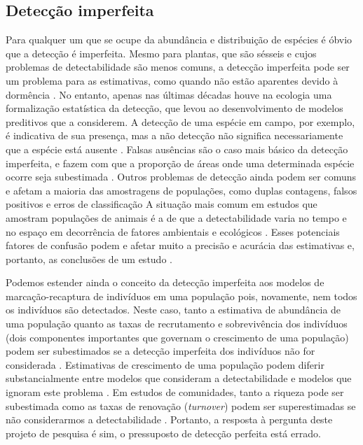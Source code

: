\documentclass[12pt, A4]{article}
\begin{document}
\subsection*{Detecção imperfeita}
\label{sec:deteccao-imperfeita}

Para qualquer um que se ocupe da abundância e distribuição de espécies
é óbvio que a detecção é imperfeita. Mesmo  para plantas, que são
sésseis e cujos problemas de detectabilidade são menos comuns, a
detecção imperfeita pode ser um problema para as estimativas, como
quando não estão aparentes devido à dormência
\citep[e.g.][]{shefferson2007}. 
No entanto, apenas nas últimas décadas houve na ecologia
uma formalização estatística da detecção, que levou ao
desenvolvimento de modelos preditivos que a considerem. A detecção de
uma espécie em campo, por exemplo, é indicativa de sua presença, mas a
não detecção não significa necessariamente que a espécie está ausente
\citep{mackenzie2002}. Falsas ausências são o caso mais básico da
detecção imperfeita, e fazem com que a proporção de
áreas onde uma determinada espécie ocorre seja subestimada
\citep{mackenzie2002}. 
Outros problemas de detecção ainda podem ser comuns e afetam a
maioria das amostragens de populações, como duplas contagens, falsos
positivos e erros de classificação \citep{buckland2001introduction}
A situação
mais comum em estudos que amostram populações de animais é a de que a
detectabilidade varia no tempo e no espaço em decorrência de fatores
ambientais e ecológicos \citep{williams2002}.
Esses potenciais fatores de confusão podem
e afetar muito a precisão e acurácia das estimativas e, portanto,
as conclusões de um estudo \citep{mackenzie2006}. 

Podemos estender ainda o conceito da detecção imperfeita aos modelos
de marcação-recaptura de indivíduos em uma população pois, novamente,
nem todos os indivíduos são detectados. Neste caso, tanto a estimativa
de abundância de uma população quanto as taxas de recrutamento e
sobrevivência dos indivíduos (dois componentes importantes que
governam o crescimento de uma população) podem ser subestimados se a
detecção imperfeita dos indivíduos não for considerada 
\citep{gimenez2008}. Estimativas de crescimento de uma população podem diferir
substancialmente entre modelos que consideram a detectabilidade e
modelos que ignoram este problema \citep{clark2004,kery2009}.
Em estudos de comunidades, tanto a riqueza pode ser
subestimada como as taxas de renovação (\emph{turnover}) podem ser
superestimadas se não considerarmos a detectabilidade 
\citep{mackenzie2003,dorazio2005}. 
Portanto, a resposta à pergunta
deste projeto de pesquisa é sim, 
o pressuposto de detecção perfeita está errado.
\end{document}
